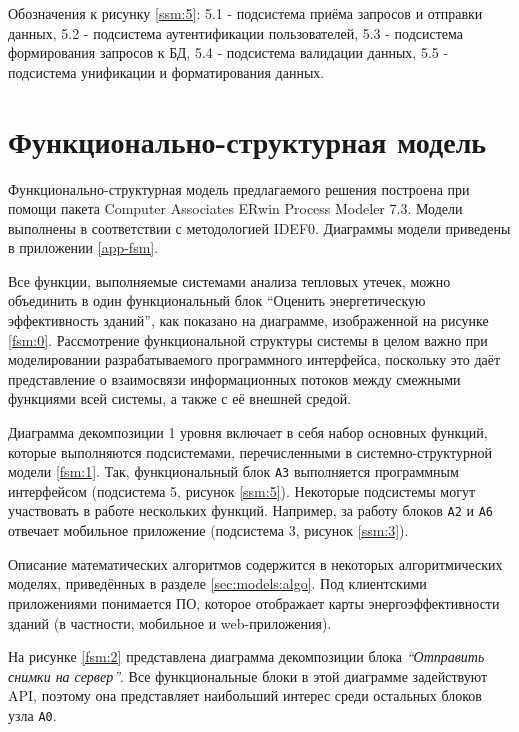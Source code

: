     Обозначения к рисунку \ref{ssm:5}: 5.1 - подсистема приёма запросов и отправки данных,  5.2 - подсистема аутентификации пользователей, 5.3 - подсистема формирования запросов к БД, 5.4 - подсистема валидации данных, 5.5 - подсистема унификации и форматирования данных.

\section{Функционально-структурная модель}

\par
	Функционально-структурная модель предлагаемого решения построена при помощи пакета {Computer Associates ERwin Process Modeler 7.3}. Модели выполнены в соответствии с методологией {IDEF0}. Диаграммы модели приведены в приложении \ref{app-fsm}.

	Все функции, выполняемые системами анализа тепловых утечек, можно объединить в один функциональный блок “Оценить энергетическую эффективность зданий”, как показано на диаграмме, изображенной на рисунке \ref{fsm:0}. Рассмотрение функциональной структуры системы в целом важно при моделировании разрабатываемого программного интерфейса, поскольку это даёт представление о взаимосвязи информационных потоков между смежными функциями всей системы, а также с её внешней средой.

\par
    Диаграмма декомпозиции 1 уровня включает в себя набор основных функций, которые выполняются подсистемами, перечисленными в системно-структурной модели \ref{fsm:1}. Так, функциональный блок \texttt{A3} выполняется программным интерфейсом (подсистема 5, рисунок \ref{ssm:5}). Некоторые подсистемы могут участвовать в работе нескольких функций. Например, за работу блоков \texttt{A2} и \texttt{A6} отвечает мобильное приложение (подсистема 3, рисунок \ref{ssm:3}).

	Описание математических алгоритмов содержится в некоторых алгоритмических моделях, приведённых в разделе \ref{sec:models:algo}. Под клиентскими приложениями понимается ПО, которое отображает карты энергоэффективности зданий (в частности, мобильное и web-приложения).

\par
    На рисунке \ref{fsm:2} представлена диаграмма декомпозиции блока \textit{“Отправить снимки на сервер”}. Все функциональные блоки в этой диаграмме задействуют API, поэтому она представляет наибольший интерес среди остальных блоков узла \texttt{A0}.

